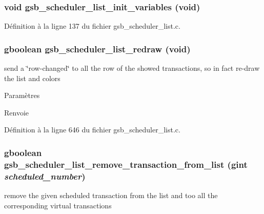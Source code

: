 \subsubsection[{gsb\_\-scheduler\_\-list\_\-init\_\-variables}]{\setlength{\rightskip}{0pt plus 5cm}void gsb\_\-scheduler\_\-list\_\-init\_\-variables (void)}\label{gsb__scheduler__list_8h_ad206fcc8ffc537e7d0eda58442a56acc}


Définition à la ligne 137 du fichier gsb\_\-scheduler\_\-list.c.

\subsubsection[{gsb\_\-scheduler\_\-list\_\-redraw}]{\setlength{\rightskip}{0pt plus 5cm}gboolean gsb\_\-scheduler\_\-list\_\-redraw (void)}\label{gsb__scheduler__list_8h_ab752b98c60209519778b0ccc5786527d}
send a \char`\"{}row-\/changed\char`\"{} to all the row of the showed transactions, so in fact re-\/draw the list and colors


\begin{DoxyParams}{Paramètres}
\item[{\em }]\end{DoxyParams}
\begin{DoxyReturn}{Renvoie}

\end{DoxyReturn}


Définition à la ligne 646 du fichier gsb\_\-scheduler\_\-list.c.

\subsubsection[{gsb\_\-scheduler\_\-list\_\-remove\_\-transaction\_\-from\_\-list}]{\setlength{\rightskip}{0pt plus 5cm}gboolean gsb\_\-scheduler\_\-list\_\-remove\_\-transaction\_\-from\_\-list (gint {\em scheduled\_\-number})}\label{gsb__scheduler__list_8h_ae61448df24743985077437b1ef276cc5}
remove the given scheduled transaction from the list and too all the corresponding virtual transactions


